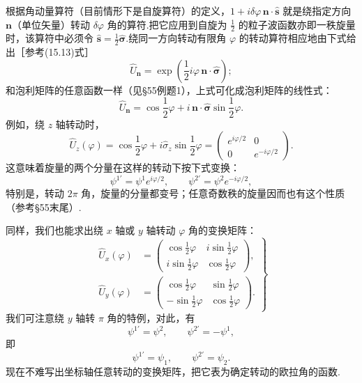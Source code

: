 根据角动量算符（目前情形下是自旋算符）的定义，$1+i\delta\varphi\,\boldsymbol{n}\cdot\hat{\boldsymbol{s}}$ 就是绕指定方向 $\boldsymbol{n}$（单位矢量）转动 $\delta\varphi$ 角的算符.把它应用到自旋为 $\frac{1}{2}$ 的粒子波函数亦即一秩旋量时，该算符中必须令 $\hat{\boldsymbol{s}}=\frac{1}{2}\hat{\boldsymbol{\sigma}}$.绕同一方向转动有限角 $\varphi$ 的转动算符相应地由下式给出［参考(15.13)式］
\begin{equation}
  \hat{U}_{\boldsymbol{n}}=\exp\left(\frac{1}{2}i\varphi\,\boldsymbol{n}\cdot\hat{\boldsymbol{\sigma}}\right);
\end{equation}
和泡利矩阵的任意函数一样（见§55例题1），上式可化成泡利矩阵的线性式：
\begin{equation}
  \hat{U}_{\boldsymbol{n}}=\cos\frac{1}{2}\varphi
  +i\,\boldsymbol{n}\cdot\hat{\boldsymbol{\sigma}}\sin\frac{1}{2}\varphi.
\end{equation}
例如，绕 $z$ 轴转动时，
\begin{equation}
  \hat{U}_z(\varphi)=\cos\frac{1}{2}\varphi+i\hat{\sigma}_z\sin\frac{1}{2}\varphi
  =\left(\begin{array}{cc}e^{i\varphi/2}&0\\0&e^{-i\varphi/2}\end{array}\right).
\end{equation}
这意味着旋量的两个分量在这样的转动下按下式变换：
\begin{equation*}
  \psi^{1'}=\psi^1e^{i\varphi/2},\qquad
  \psi^{2'}=\psi^2e^{-i\varphi/2},
\end{equation*}
特别是，转动 $2\pi$ 角，旋量的分量都变号；任意奇数秩的旋量因而也有这个性质（参考§55末尾）.

同样，我们也能求出绕 $x$ 轴或 $y$ 轴转动 $\varphi$ 角的变换矩阵：
\begin{equation}
\left.\begin{aligned}
  \hat{U}_x(\varphi)&=\left(\begin{array}{cc}
  \cos\frac{1}{2}\varphi & i\sin\frac{1}{2}\varphi\\
  i\sin\frac{1}{2}\varphi & \cos\frac{1}{2}\varphi
  \end{array}\right),\\
  \hat{U}_y(\varphi)&=\left(\begin{array}{cc}
  \cos\frac{1}{2}\varphi & \sin\frac{1}{2}\varphi\\
  -\sin\frac{1}{2}\varphi & \cos\frac{1}{2}\varphi
  \end{array}\right).
\end{aligned}\right\}
\end{equation}
我们可注意绕 $y$ 轴转 $\pi$ 角的特例，对此，有
\begin{equation*}
  \psi^{1'}=\psi^2,\qquad \psi^{2'}=-\psi^1,
\end{equation*}
即
\begin{equation}
  \psi^{1'}=\psi_1,\qquad \psi^{2'}=\psi_2.
\end{equation}
现在不难写出坐标轴任意转动的变换矩阵，把它表为确定转动的欧拉角的函数.

